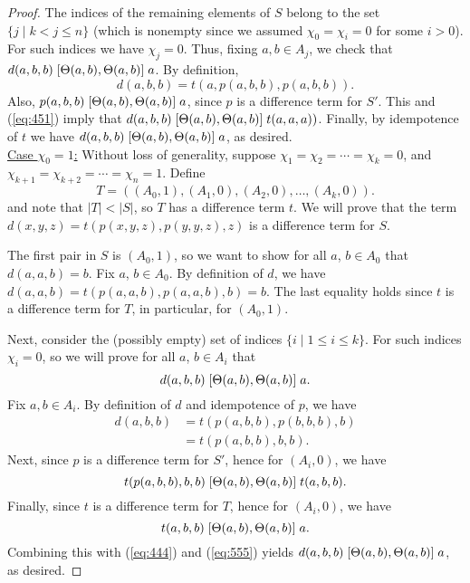 \begin{proof}
The indices of the remaining elements of $S$
belong to the set $\{j \mid k<j\leq n\}$ (which is nonempty since we
assumed $\chi_0 = \chi_i = 0$ for some $i>0$).
For such indices we have $\chi_j = 0$.
Thus, fixing $a, b \in A_j$, we check that
$d(a,b,b)\mathrel{[\Theta(a,b), \Theta(a,b)]} a$.
By definition,
\begin{equation}
  \label{eq:451}
d(a,b,b) =t(a, p(a,b,b), p(a,b,b)).  
\end{equation}
Also, $p(a,b,b) \mathrel{[\Theta(a,b), \Theta(a,b)]} a$,
since $p$ is a \glocal difference term for $S'$.
This and (\ref{eq:451}) imply
that
$d(a, b,b) \mathrel{[\Theta(a,b), \Theta(a,b)]} t(a,a,a))$.
Finally, by idempotence of $t$ we have
$d(a,b,b)\mathrel{[\Theta(a,b), \Theta(a,b)]} a$,
as desired.
\\[6pt]
\underline{Case $\chi_0 = 1$:}
Without loss of generality, suppose $\chi_1 = \chi_2 =\cdots =\chi_k = 0$,
and $\chi_{k+1} = \chi_{k+2} = \cdots = \chi_{n} = 1$.
Define
\[
T = ((A_0, 1), (A_1, 0), (A_2, 0), \dots, (A_k, 0)).
\]
and note that $|T| < |S|$, so $T$ has a \glocal difference term $t$.
We will prove that the term $d(x,y,z) = t(p(x,y,z), p(y,y,z), z)$
is a \glocal difference term for $S$.

The first pair in $S$ is $(A_0, 1)$, so we want to show for all $a$, $b \in A_0$ that
$d(a,a,b) = b$.
Fix $a$, $b \in A_0$. By definition of $d$,
we have $d(a,a,b) = t(p(a,a,b), p(a,a,b), b) =b$.
The last equality holds since $t$ is a \glocal difference term for $T$, in particular,
for $(A_0, 1)$.

Next, consider the (possibly empty) set of indices $\{i \mid 1\leq i \leq k\}$.
For such indices $\chi_i =0$, so we will prove
for all $a$, $b \in A_i$ that
\[
d(a,b,b) \mathrel{[\Theta(a,b), \Theta(a,b)]} a.
\]
Fix $a, b\in A_i$.
By definition of $d$ and idempotence of $p$, we have
\begin{align}
  d(a,b,b) &=
  t(p(a,b,b), p(b,b,b), b)   \label{eq:444}\\
  &=t(p(a,b,b), b, b). \nonumber
\end{align}
Next, since $p$ is a \glocal difference term for $S'$,
hence for $(A_i, 0)$, we have
\begin{equation}
  \label{eq:555}
  t(p(a,b,b), b, b)
 \comm{\Cg(a,b)}{\Cg(a,b)}
 t(a, b, b).
\end{equation}
Finally, since $t$ is a \glocal difference term for $T$, hence for
$(A_i, 0)$,  %
we have 
\[
t(a, b, b) \mathrel{[\Theta(a,b), \Theta(a,b)]} a.
\]
Combining this with (\ref{eq:444}) and (\ref{eq:555}) yields
$d(a,b,b) \mathrel{[\Theta(a,b), \Theta(a,b)]} a$,
as desired.


\end{proof}
